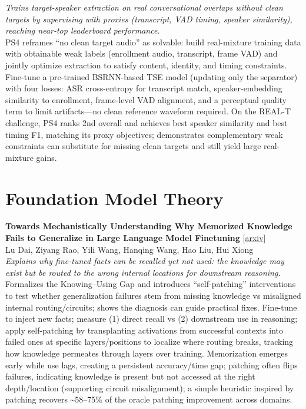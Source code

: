 \documentclass[12pt,letterpaper]{article}
\begin{document}
{\small\textit{Trains target-speaker extraction on real conversational overlaps without clean targets by supervising with proxies (transcript, VAD timing, speaker similarity), reaching near-top leaderboard performance.}}\\[1pt]
{\footnotesize PS4 reframes ``no clean target audio'' as solvable: build real-mixture training data with obtainable weak labels (enrollment audio, transcript, frame VAD) and jointly optimize extraction to satisfy content, identity, and timing constraints. Fine-tune a pre-trained BSRNN-based TSE model (updating only the separator) with four losses: ASR cross-entropy for transcript match, speaker-embedding similarity to enrollment, frame-level VAD alignment, and a perceptual quality term to limit artifacts---no clean reference waveform required. On the REAL-T challenge, PS4 ranks 2nd overall and achieves best speaker similarity and best timing F1, matching its proxy objectives; demonstrates complementary weak constraints can substitute for missing clean targets and still yield large real-mixture gains.}

\medskip


\section*{Foundation Model Theory}

{\small\textbf{Towards Mechanistically Understanding Why Memorized Knowledge Fails to Generalize in Large Language Model Finetuning}} {\scriptsize[\href{https://arxiv.org/abs/2607.08393}{arxiv}]}\\
{\scriptsize Lu Dai, Ziyang Rao, Yili Wang, Hanqing Wang, Hao Liu, Hui Xiong}\\

{\small\textit{Explains why fine-tuned facts can be recalled yet not used: the knowledge may exist but be routed to the wrong internal locations for downstream reasoning.}}\\[1pt]
{\footnotesize Formalizes the Knowing--Using Gap and introduces ``self-patching'' interventions to test whether generalization failures stem from missing knowledge vs misaligned internal routing/circuits; shows the diagnosis can guide practical fixes. Fine-tune to inject new facts; measure (1) direct recall vs (2) downstream use in reasoning; apply self-patching by transplanting activations from successful contexts into failed ones at specific layers/positions to localize where routing breaks, tracking how knowledge permeates through layers over training. Memorization emerges early while use lags, creating a persistent accuracy/time gap; patching often flips failures, indicating knowledge is present but not accessed at the right depth/location (supporting circuit misalignment); a simple heuristic inspired by patching recovers \textasciitilde{}58--75\% of the oracle patching improvement across domains.}
\end{document}
